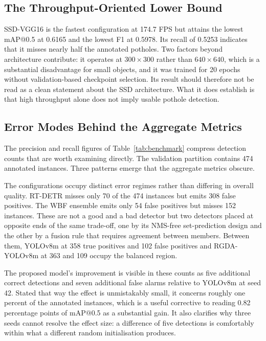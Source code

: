 \documentclass[MScCS]{uccthesis}
\begin{document}
\subsection{The Throughput-Oriented Lower Bound}

SSD-VGG16 is the fastest configuration at 174.7 FPS but attains the lowest
mAP@0.5 at 0.6165 and the lowest F1 at 0.5978. Its recall of 0.5253 indicates
that it misses nearly half the annotated potholes. Two factors beyond
architecture contribute: it operates at $300 \times 300$ rather than
$640 \times 640$, which is a substantial disadvantage for small objects, and it
was trained for 20 epochs without validation-based checkpoint selection. Its
result should therefore not be read as a clean statement about the SSD
architecture. What it does establish is that high throughput alone does not
imply usable pothole detection.

\subsection{Error Modes Behind the Aggregate Metrics}
\label{sec:results_errors}

The precision and recall figures of Table~\ref{tab:benchmark} compress
detection counts that are worth examining directly. The validation partition
contains 474 annotated instances. Three patterns emerge that the aggregate
metrics obscure.

The configurations occupy distinct error regimes rather than differing in
overall quality. RT-DETR misses only 70 of the 474 instances but emits 308
false positives. The WBF ensemble emits only 54 false positives but misses 152
instances. These are not a good and a bad detector but two detectors placed at
opposite ends of the same trade-off, one by its NMS-free set-prediction design
and the other by a fusion rule that requires agreement between members. Between
them, YOLOv8m at 358 true positives and 102 false positives and RGDA-YOLOv8m at
363 and 109 occupy the balanced region.

The proposed model's improvement is visible in these counts as five additional
correct detections and seven additional false alarms relative to YOLOv8m at
seed 42. Stated that way the effect is unmistakably small, it concerns
roughly one percent of the annotated instances, which is a useful corrective
to reading 0.82 percentage points of mAP@0.5 as a substantial gain. It also
clarifies why three seeds cannot resolve the effect size: a difference of five
detections is comfortably within what a different random initialisation
produces.
\end{document}
